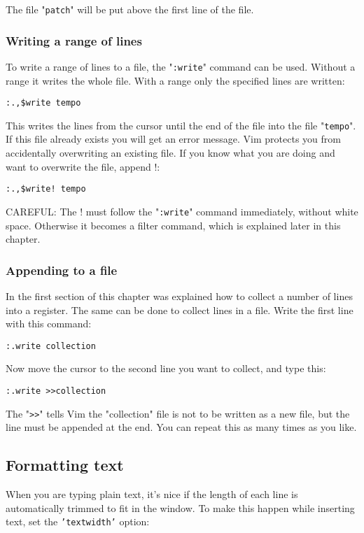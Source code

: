 {{The file "\texttt{patch}" will be put above the first line of the file.
\subsubsection{Writing a range of lines}
To write a range of lines to a file, the "\texttt{:write}" command can be used.
Without a range it writes the whole file.
With a range only the specified lines are written:

\begin{Verbatim}[samepage=true]
 :.,$write tempo
\end{Verbatim}

This writes the lines from the cursor until the end of the file into the file "\texttt{tempo}".
If this file already exists you will get an error message.
Vim protects you from accidentally overwriting an existing file.
If you know what you are doing and want to overwrite the file, append !:

\begin{Verbatim}[samepage=true]
 :.,$write! tempo
\end{Verbatim}

CAREFUL: The ! must follow the "\texttt{:write}" command immediately, without white space.
Otherwise it becomes a filter command, which is explained later in this chapter.
\subsubsection{Appending to a file}
In the first section of this chapter was explained how to collect a number of lines into a register.
The same can be done to collect lines in a file.
Write the first line with this command:

\begin{Verbatim}[samepage=true]
 :.write collection
\end{Verbatim}

Now move the cursor to the second line you want to collect, and type this:

\begin{Verbatim}[samepage=true]
 :.write >>collection
\end{Verbatim}

The "\texttt{>>}" tells Vim the "collection" file is not to be written as a new file, but the line must be appended at the end.
You can repeat this as many times as you like.
\subsection{Formatting text}
When you are typing plain text, it's nice if the length of each line is automatically trimmed to fit in the window.
To make this happen while inserting text, set the \texttt{'textwidth'} option:

}}
